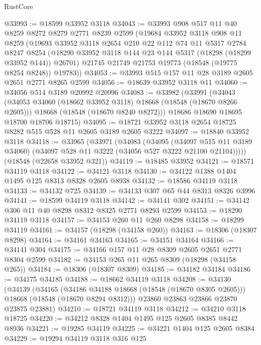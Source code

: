 \begin{lexlean}{RustCore}
\begin{coremodule}
@33993 := @18599 @33952 @3118
@34043 := @33993
    @908
    @517
    @11
    @40
    @8259
    @8272
    @8279
    @2771
    @8239
    @2599
    (@19684
      @33952
      @3118
      @908
      @11
      @8259
      (@19693
        @33952
        @3118
        @2654
        @210
        @22
        @112
        @74
        @11
        @5317
        @2784
        @8247
        @8254
        (@18290 @33952 @3118 @144 @23 @144 @5317 (@18298 (@18299 @33952 @144)) @26701)
        @21745
        @21749
        @21753
        @19773
        (@18548 (@19775 @8254 @8248))
        @19783))
@34053 := @33993 @515 @157 @11 @28 @3189 @2605 @2651 @2771 @8265 @2599
@34056 := @18639 @33952 @3118 @11
@34060 := @34056 @514 @3189 @20992 @20996
@34083 := @33982
    (@33991
      (@34043
        (@34053 @34060 (@18662 @33952 @3118) @18668 (@18548 (@18670 @8266 @2605)))
        @18668
        (@18548 (@18670 @8240 @8272)))
      @18686
      @18690
      @18695
      @18700
      @18706
      @18715)
@34095 := @18721 @33952 @3118 @2654 @18725 @8282 @515 @528 @11 @2605 @3189 @2605 @3222
@34097 := @18840 @33952 @3118
@34118 := @33965
    (@33971
      (@34083
        (@34095
          (@34097 @515 @11 @3189 @34060)
          (@34097 @528 @11 @3222 (@34056 @527 @3222 @21100 @21104)))))
    (@18548 (@22658 @33952 @321))
@34119 := @18485 @33952
@34121 := @18571 @34119 @3118
@34122 := @34121 @3118
@34130 := @34122 @1388 @1404 @1495 @125 @8313 @8328 @2605 @8938
@34132 := @18586 @34119 @3118
@34133 := @34132 @725
@34139 := @34133 @307 @65 @44 @8313 @8326 @3996
@34141 := @18599 @34119 @3118
@34142 := @34141 @302
@34151 := @34142 @306 @11 @40 @8298 @8312 @8325 @2771 @8293 @2599
@34153 := @18290 @34119 @3118
@34157 := @34153 @260 @11 @260 @8298
@34158 := @18299 @34119
@34161 := @34157 (@18298 (@34158 @260))
@34163 := @18306 (@18307 @8298)
@34164 := @34161 @34163
@34165 := @34151 @34164
@34166 := @34141 @304
@34175 := @34166 @157 @11 @28 @8309 @2605 @2651 @2771 @8304 @2599
@34182 := @34153 @265 @11 @265 @8309 (@18298 (@34158 @265))
@34184 := @18306 (@18307 @8309)
@34185 := @34182 @34184
@34186 := @34175 @34185
@34188 := @18662 @34119 @3118
@34208 := @34130
    (@34139
      (@34165
        (@34186 @34188 @18668 (@18548 (@18670 @8305 @2605)))
        @18668
        (@18548 (@18670 @8294 @8312)))
      @23860
      @23863
      @23866
      @23870
      @23875
      @23881)
@34210 := @18721 @34119 @3118
@34212 := @34210 @3118 @18725
@34220 := @34212 @8328 @1404 @1495 @125 @2605 @8385 @8442 @8936
@34221 := @19285 @34119
@34225 := @34221 @1404 @125 @2605 @8384
@34229 := @19294 @34119 @3118 @316 @125

\end{coremodule}
\end{lexlean}
